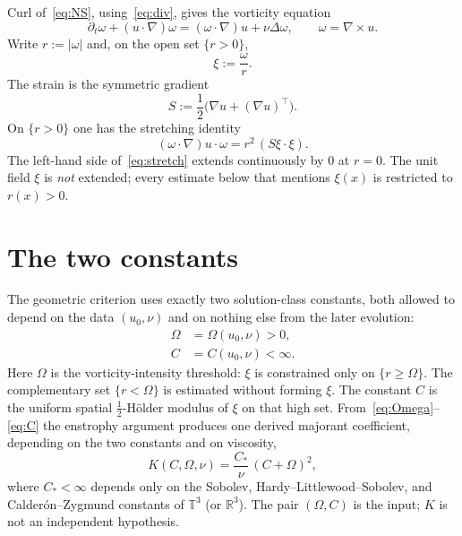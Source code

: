 \documentclass[11pt,a4paper]{article}
\theoremstyle{definition}
\theoremstyle{remark}
\newcommand{\R}{\mathbb{R}}
\newcommand{\T}{\mathbb{T}}
\newcommand{\abs}[1]{\lvert#1\rvert}
\begin{document}
Curl of~\eqref{eq:NS}, using~\eqref{eq:div}, gives the vorticity equation
\begin{equation}
\label{eq:vort}
\partial_t\omega+(u\cdot\nabla)\omega=(\omega\cdot\nabla)u+\nu\Delta\omega,
\qquad\omega=\nabla\times u.
\end{equation}
Write \(r:=\abs{\omega}\) and, on the open set \(\{r>0\}\),
\begin{equation}
\label{eq:xi}
\xi:=\frac{\omega}{r}.
\end{equation}
The strain is the symmetric gradient
\begin{equation}
\label{eq:S}
S:=\frac12\bigl(\nabla u+(\nabla u)^\top\bigr).
\end{equation}
On \(\{r>0\}\) one has the stretching identity
\begin{equation}
\label{eq:stretch}
(\omega\cdot\nabla)u\cdot\omega=r^2\,(S\xi\cdot\xi).
\end{equation}
The left-hand side of~\eqref{eq:stretch} extends continuously by \(0\)
at \(r=0\). The unit field \(\xi\) is \emph{not} extended; every estimate
below that mentions \(\xi(x)\) is restricted to \(r(x)>0\).

\section{The two constants}
\label{sec:constants}

The geometric criterion uses exactly two solution-class constants,
both allowed to depend on the data \((u_0,\nu)\) and on nothing else
from the later evolution:
\begin{align}
\Omega&=\Omega(u_0,\nu)>0,
\label{eq:Omega}\\
C&=C(u_0,\nu)<\infty.
\label{eq:C}
\end{align}
Here \(\Omega\) is the vorticity-intensity threshold: \(\xi\) is constrained
only on \(\{r\ge\Omega\}\). The complementary set \(\{r<\Omega\}\) is
estimated without forming \(\xi\). The constant \(C\) is the uniform
spatial \(\tfrac12\)-H\"older modulus of \(\xi\) on that high set.
From~\eqref{eq:Omega}--\eqref{eq:C} the enstrophy argument produces one
derived majorant coefficient, depending on the two constants and on
viscosity,
\begin{equation}
\label{eq:Kconst}
K(C,\Omega,\nu)=\frac{C_\ast}{\nu}\,(C+\Omega)^2,
\end{equation}
where \(C_\ast<\infty\) depends only on the Sobolev, Hardy--Littlewood--Sobolev,
and Calder\'on--Zygmund constants of \(\T^3\) (or \(\R^3\)). The pair
\((\Omega,C)\) is the input; \(K\) is not an independent hypothesis.
\end{document}
